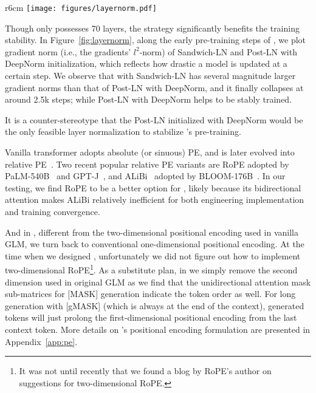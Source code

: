 {\begin{wrapfigure}{r}{6cm}
    \small
    \vspace{-4mm}
    \centering
    \texttt{[image: figures/layernorm.pdf]}
    \vspace{-5mm}
    \caption{Different LNs' gradient norm along \glm's early training steps.}
    \label{fig:layernorm}
    \vspace{-6mm}
\end{wrapfigure}

Though \glm only possesses 70 layers, the strategy significantly benefits the training stability.
In Figure~\ref{fig:layernorm}, along the early pre-training steps of \glm, we plot gradient norm (i.e., the gradients' $l^2$-norm) of Sandwich-LN and Post-LN with DeepNorm initialization, which reflects how drastic a model is updated at a certain step.
We observe that \glm with Sandwich-LN has several magnitude larger gradient norms than that of Post-LN with DeepNorm, and it finally collapses at around 2.5k steps; while Post-LN with DeepNorm helps \glm to be stably trained.

\begin{insight}
\rm It is a counter-stereotype that the Post-LN initialized with DeepNorm would be the only feasible layer normalization to stabilize \glm's pre-training. 
\end{insight}

Vanilla transformer adopts absolute (or sinuous) PE, and is later evolved into relative PE~\citep{dai2019transformer}.
Two recent popular relative PE variants are RoPE adopted by PaLM-540B~\citep{chowdhery2022palm} and GPT-J~\cite{gpt-j}, and ALiBi~\citep{press2021train} adopted by BLOOM-176B~\citep{scao2022what}.
In our testing, we find RoPE to be a better option for \glm, 
likely because its bidirectional attention makes ALiBi relatively inefficient for both engineering implementation and training convergence.

And in \glm, different from the two-dimensional positional encoding used in vanilla GLM, we turn back to conventional one-dimensional positional encoding.
At the time when we designed \glm, unfortunately we did not figure out how to implement two-dimensional RoPE\footnote{It was not until recently that we found a blog by RoPE's author on suggestions for two-dimensional RoPE.}.
As a substitute plan, in \glm we simply remove the second dimension used in original GLM as we find that the unidirectional attention mask sub-matrices for [MASK] generation indicate the token order as well.
For long generation with [gMASK] (which is always at the end of the context), generated tokens will just prolong the first-dimensional positional encoding from the last context token.
More details on \glm's positional encoding formulation are presented in Appendix~\ref{app:pe}.

}
